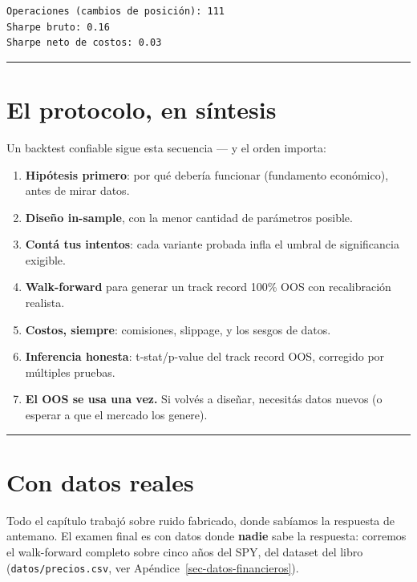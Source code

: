 \documentclass[
  spanish,
  letterpaper,
  DIV=11,
  numbers=noendperiod]{scrreprt}
\providecommand{\tightlist}{%
  \setlength{\itemsep}{0pt}\setlength{\parskip}{0pt}}
\begin{document}
\begin{verbatim}
Operaciones (cambios de posición): 111
Sharpe bruto: 0.16
Sharpe neto de costos: 0.03
\end{verbatim}

\begin{center}\rule{0.5\linewidth}{0.5pt}\end{center}

\chapter{El protocolo, en síntesis}\label{el-protocolo-en-suxedntesis}

Un backtest confiable sigue esta secuencia --- y el orden importa:

\begin{enumerate}
\def\labelenumi{\arabic{enumi}.}
\tightlist
\item
  \textbf{Hipótesis primero}: por qué debería funcionar (fundamento
  económico), antes de mirar datos.
\item
  \textbf{Diseño in-sample}, con la menor cantidad de parámetros
  posible.
\item
  \textbf{Contá tus intentos}: cada variante probada infla el umbral de
  significancia exigible.
\item
  \textbf{Walk-forward} para generar un track record 100\% OOS con
  recalibración realista.
\item
  \textbf{Costos, siempre}: comisiones, slippage, y los sesgos de datos.
\item
  \textbf{Inferencia honesta}: t-stat/p-value del track record OOS,
  corregido por múltiples pruebas.
\item
  \textbf{El OOS se usa una vez.} Si volvés a diseñar, necesitás datos
  nuevos (o esperar a que el mercado los genere).
\end{enumerate}

\begin{center}\rule{0.5\linewidth}{0.5pt}\end{center}

\chapter{Con datos reales}\label{con-datos-reales-3}

Todo el capítulo trabajó sobre ruido fabricado, donde sabíamos la
respuesta de antemano. El examen final es con datos donde \textbf{nadie}
sabe la respuesta: corremos el walk-forward completo sobre cinco años
del SPY, del dataset del libro (\texttt{datos/precios.csv}, ver
Apéndice~\ref{sec-datos-financieros}).
\end{document}
